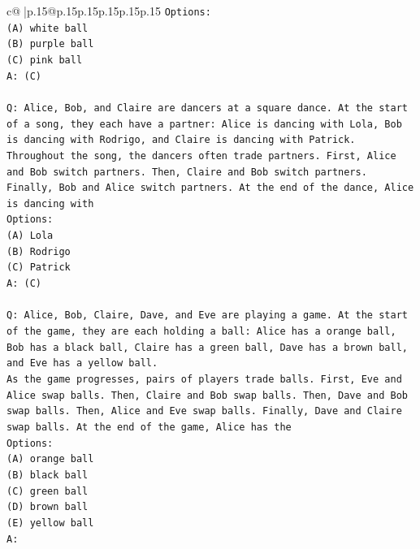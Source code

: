 \documentclass{article}
\begin{document}
{\begin{supertabular}{c@{$\;$}|p{.15\linewidth}@{}p{.15\linewidth}p{.15\linewidth}p{.15\linewidth}p{.15\linewidth}p{.15\linewidth}}
{{{\texttt{Options:} \\
\texttt{(A) white ball} \\
\texttt{(B) purple ball} \\
\texttt{(C) pink ball} \\
\texttt{A: (C)} \\
\\ 
\texttt{Q: Alice, Bob, and Claire are dancers at a square dance. At the start of a song, they each have a partner: Alice is dancing with Lola, Bob is dancing with Rodrigo, and Claire is dancing with Patrick.} \\
\texttt{Throughout the song, the dancers often trade partners. First, Alice and Bob switch partners. Then, Claire and Bob switch partners. Finally, Bob and Alice switch partners. At the end of the dance, Alice is dancing with} \\
\texttt{Options:} \\
\texttt{(A) Lola} \\
\texttt{(B) Rodrigo} \\
\texttt{(C) Patrick} \\
\texttt{A: (C)} \\
\\ 
\texttt{Q: Alice, Bob, Claire, Dave, and Eve are playing a game. At the start of the game, they are each holding a ball: Alice has a orange ball, Bob has a black ball, Claire has a green ball, Dave has a brown ball, and Eve has a yellow ball.} \\
\texttt{As the game progresses, pairs of players trade balls. First, Eve and Alice swap balls. Then, Claire and Bob swap balls. Then, Dave and Bob swap balls. Then, Alice and Eve swap balls. Finally, Dave and Claire swap balls. At the end of the game, Alice has the} \\
\texttt{Options:} \\
\texttt{(A) orange ball} \\
\texttt{(B) black ball} \\
\texttt{(C) green ball} \\
\texttt{(D) brown ball} \\
\texttt{(E) yellow ball} \\
\texttt{A:} \\
            }
        }
    }
     \\ \\


\end{supertabular}}
\end{document}
